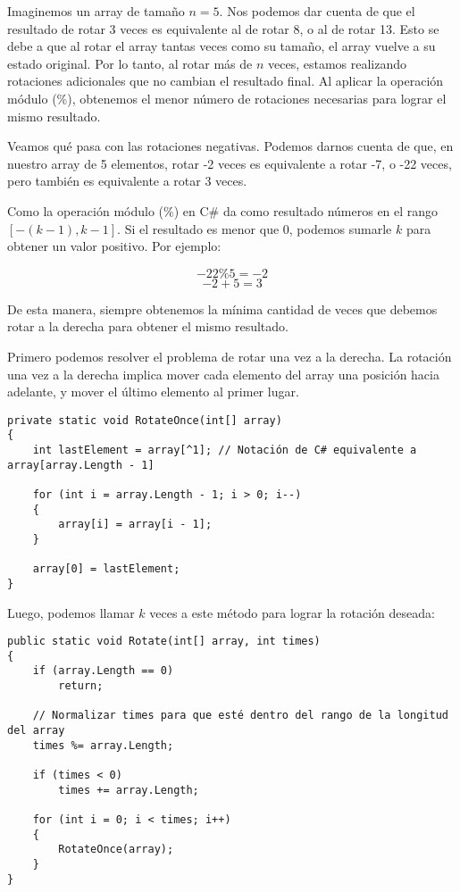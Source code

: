 Imaginemos un array de tamaño $n = 5$. Nos podemos dar cuenta de que el resultado de rotar 3 veces es equivalente al de rotar 8, o al de rotar 13. Esto se debe a que al rotar el array tantas veces como su tamaño, el array vuelve a su estado original. Por lo tanto, al rotar más de $n$ veces, estamos realizando rotaciones adicionales que no cambian el resultado final. Al aplicar la operación módulo (\%), obtenemos el menor número de rotaciones necesarias para lograr el mismo resultado.

Veamos qué pasa con las rotaciones negativas. Podemos darnos cuenta de que, en nuestro array de 5 elementos, rotar -2 veces es equivalente a rotar -7, o -22 veces, pero también es equivalente a rotar 3 veces. 

Como la operación módulo (\%) en C\# da como resultado números en el rango \([-(k-1), k-1]\). Si el resultado es menor que 0, podemos sumarle \( k \) para obtener un valor positivo. Por ejemplo:

\[
-22 \% 5 = -2
\]
\[
-2 + 5 = 3
\]

De esta manera, siempre obtenemos la mínima cantidad de veces que debemos rotar a la derecha para obtener el mismo resultado.

Primero podemos resolver el problema de rotar una vez a la derecha. La rotación una vez a la derecha implica mover cada elemento del array una posición hacia adelante, y mover el último elemento al primer lugar.

\begin{lstlisting}
private static void RotateOnce(int[] array)
{
    int lastElement = array[^1]; // Notación de C# equivalente a array[array.Length - 1]
    
    for (int i = array.Length - 1; i > 0; i--)
    {
        array[i] = array[i - 1];
    }
    
    array[0] = lastElement;
}
\end{lstlisting}

Luego, podemos llamar $k$ veces a este método para lograr la rotación deseada:

\begin{lstlisting}
public static void Rotate(int[] array, int times)
{
    if (array.Length == 0)
        return;

    // Normalizar times para que esté dentro del rango de la longitud del array
    times %= array.Length;
    
    if (times < 0)
        times += array.Length;
        
    for (int i = 0; i < times; i++)
    {
        RotateOnce(array);
    }
}
\end{lstlisting}

